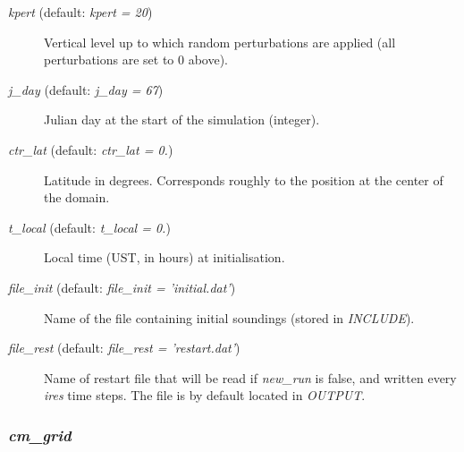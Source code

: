 \documentclass[12pt,A4,french]{article}
\begin{document}
\begin{description}
\item[{\it kpert} (default: {\it kpert = 20})]

Vertical level up to which random perturbations are applied (all perturbations are set to 0 above).

\item[{\it j\_day} (default: {\it j\_day = 67})]

Julian day at the start of the simulation (integer).

\item[{\it ctr\_lat} (default: {\it ctr\_lat = 0.})]

Latitude in degrees. Corresponds roughly to the position at the center of the domain.

\item[{\it t\_local} (default: {\it t\_local = 0.})]

Local time (UST, in hours) at initialisation. 

\item[{\it file\_init} (default: {\it file\_init = 'initial.dat'})]

Name of the file containing initial soundings (stored in {\it INCLUDE}).

\item[{\it file\_rest} (default: {\it file\_rest = 'restart.dat'})]

Name of restart file that will be read if {\it new\_run} is false, and written every {\it ires} time steps. The file is by default located in {\it OUTPUT}.

\end{description}

\subsubsection{{\it cm\_grid}}
\end{document}
